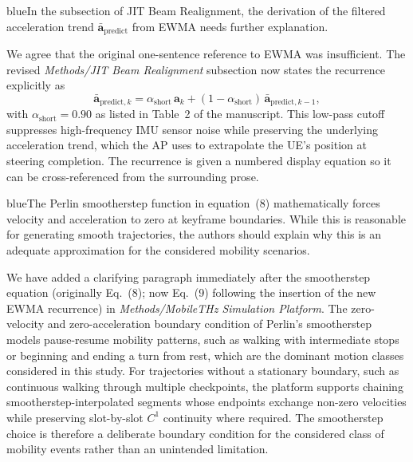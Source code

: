 \documentclass{article}
\newcommand{\blue}[1]{\begin{color}{blue}#1\end{color}}
\begin{document}
\begin{tcbremark}
{\selectfont
\blue{In the subsection of JIT Beam Realignment, the derivation of the filtered acceleration trend $\bar{\mathbf{a}}_{\text{predict}}$ from EWMA needs further explanation.}
}
\end{tcbremark}

\noindent We agree that the original one-sentence reference to EWMA was insufficient. The revised \emph{Methods/JIT Beam Realignment} subsection now states the recurrence explicitly as
\begin{equation}
    \bar{\mathbf{a}}_{\text{predict},k} = \alpha_{\text{short}}\, \mathbf{a}_k + (1 - \alpha_{\text{short}})\, \bar{\mathbf{a}}_{\text{predict},k-1},
\end{equation}
with $\alpha_{\text{short}} = 0.90$ as listed in Table~2 of the manuscript. This low-pass cutoff suppresses high-frequency IMU sensor noise while preserving the underlying acceleration trend, which the AP uses to extrapolate the UE's position at steering completion. The recurrence is given a numbered display equation so it can be cross-referenced from the surrounding prose.

\begin{tcbremark}
{\selectfont
\blue{The Perlin smootherstep function in equation~(8) mathematically forces velocity and acceleration to zero at keyframe boundaries. While this is reasonable for generating smooth trajectories, the authors should explain why this is an adequate approximation for the considered mobility scenarios.}
}
\end{tcbremark}

\noindent We have added a clarifying paragraph immediately after the smootherstep equation (originally Eq.~(8); now Eq.~(9) following the insertion of the new EWMA recurrence) in \emph{Methods/MobileTHz Simulation Platform}. The zero-velocity and zero-acceleration boundary condition of Perlin's smootherstep models pause-resume mobility patterns, such as walking with intermediate stops or beginning and ending a turn from rest, which are the dominant motion classes considered in this study. For trajectories without a stationary boundary, such as continuous walking through multiple checkpoints, the platform supports chaining smootherstep-interpolated segments whose endpoints exchange non-zero velocities while preserving slot-by-slot $C^1$ continuity where required. The smootherstep choice is therefore a deliberate boundary condition for the considered class of mobility events rather than an unintended limitation.
\end{document}
